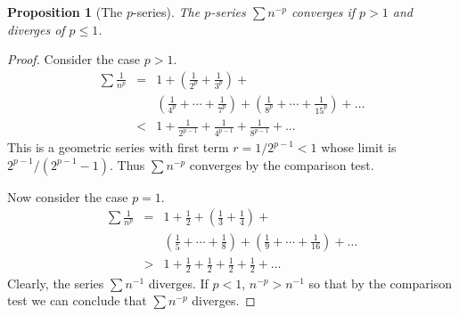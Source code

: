 \documentclass{article}
\theoremstyle{plain}
\numberwithin{thm}{section}
\theoremstyle{plain}
\newtheorem{prop}{Proposition}
\numberwithin{prop}{section}
\theoremstyle{definition}
\numberwithin{defn}{section}
\theoremstyle{remark}
\numberwithin{equation}{section}
\begin{document}
\begin{prop}[The $p$-series]\label{s4p2}
The $p$-series $\sum n^{-p}$ converges if $p > 1$ and diverges of $p \le 1$.
\end{prop}
\begin{proof} Consider the case $p > 1$.
\begin{eqnarray*}
\sum\frac{1}{n^p} &=& 1 + \left(\frac{1}{2^p} + \frac{1}{3^p}\right) + \\
 & & \left(\frac{1}{4^p} + \cdots + \frac{1}{7^p}\right) +
     \left(\frac{1}{8^p} + \cdots + \frac{1}{15^p}\right) + \ldots \\
 &<& 1 + \frac{1}{2^{p-1}} + \frac{1}{4^{p-1}} + \frac{1}{8^{p-1}} + \ldots
\end{eqnarray*}
This is a geometric series with first term $r = 1/2^{p-1} < 1$ whose limit is
$2^{p-1}/(2^{p-1} - 1)$. Thus $\sum n^{-p}$ converges by the comparison test.

Now consider the case $p = 1$.
\begin{eqnarray*}
\sum\frac{1}{n^p}&=&1 + \frac{1}{2} + \left(\frac{1}{3} + \frac{1}{4}\right)+\\
 & & \left(\frac{1}{5} + \cdots + \frac{1}{8}\right) +
     \left(\frac{1}{9} + \cdots + \frac{1}{16}\right) + \ldots \\
 &>& 1 + \frac{1}{2} + \frac{1}{2} + \frac{1}{2} + \frac{1}{2} + \ldots
\end{eqnarray*}
Clearly, the series $\sum n^{-1}$ diverges. If $p < 1$, $n^{-p} > n^{-1}$ so 
that by the comparison test we can conclude that $\sum n^{-p}$ diverges.
\end{proof}
\end{document}
